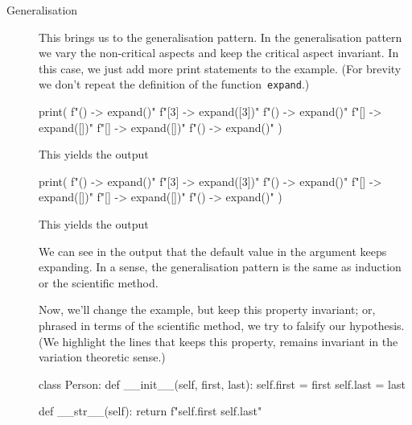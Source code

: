 \begin{description}
  \item[Generalisation] This brings us to the generalisation pattern.
    In the generalisation pattern we vary the non-critical aspects and keep the 
    critical aspect invariant.
    In this case, we just add more print statements to the example.
    (For brevity we don't repeat the definition of the 
    function~\texttt{expand}.)

    \begin{minipage}[t]{0.45\columnwidth}
      \begin{pyblock}[default1]
print(
  f"()  -> {expand()}\n"
  f"[3] -> {expand([3])}\n"
  f"()  -> {expand()}\n"
  f"[]  -> {expand([])}\n"
  f"[]  -> {expand([])}\n"
  f"()  -> {expand()}\n"
)
      \end{pyblock}
      \vspace{0.5em}
      This yields the output
      \vspace{0.5em}
      \printpythontex[verbatim]
    \end{minipage}
    \hfill
    \begin{minipage}[t]{0.45\columnwidth}
      \begin{pyblock}[default2]
print(
  f"()  -> {expand()}\n"
  f"[3] -> {expand([3])}\n"
  f"()  -> {expand()}\n"
  f"[]  -> {expand([])}\n"
  f"[]  -> {expand([])}\n"
  f"()  -> {expand()}\n"
)
      \end{pyblock}

      \vspace{0.5em}
      This yields the output
      \vspace{0.5em}
    \printpythontex[verbatim][highlightlines={1,3,6}]
    \end{minipage}

    We can see in the output that the default value in the argument keeps 
    expanding.
    In a sense, the generalisation pattern is the same as induction or the 
    scientific method.

    Now, we'll change the example, but keep this property invariant;
    or, phrased in terms of the scientific method, we try to falsify our 
    hypothesis.
    (We highlight the lines that keeps this property, \ie remains invariant in 
    the variation theoretic sense.)
    \begin{pyblock}[default1][highlightlines={10-12}]
class Person:
  def __init__(self, first, last):
    self.first = first
    self.last = last

  def __str__(self):
    return f"{self.first} {self.last}"


\end{pyblock}
\end{description}
